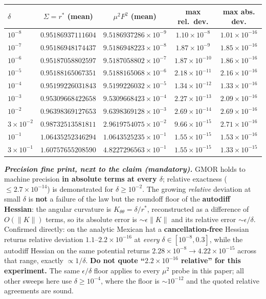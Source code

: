 \documentclass[10pt]{article}
\begin{document}
\begin{center}\small
\begin{tabular}{lcccc}
\toprule
$\delta$ & $\Sigma=r^*$ (mean) & $\mu^2F^2$ (mean) & max rel.\ dev. & max \textbf{abs.} dev. \\
\midrule
$10^{-8}$ & $0.95186937111604$ & $9.5186937286{\times}10^{-9}$ & $1.10{\times}10^{-8}$ & $1.01{\times}10^{-16}$ \\
$10^{-7}$ & $0.95186948174437$ & $9.5186948223{\times}10^{-8}$ & $1.87{\times}10^{-9}$ & $1.85{\times}10^{-16}$ \\
$10^{-6}$ & $0.95187058802597$ & $9.5187058802{\times}10^{-7}$ & $1.87{\times}10^{-10}$ & $1.86{\times}10^{-16}$ \\
$10^{-5}$ & $0.95188165067351$ & $9.5188165068{\times}10^{-6}$ & $2.18{\times}10^{-11}$ & $2.16{\times}10^{-16}$ \\
$10^{-4}$ & $0.95199226031843$ & $9.5199226032{\times}10^{-5}$ & $1.34{\times}10^{-12}$ & $1.33{\times}10^{-16}$ \\
$10^{-3}$ & $0.95309668422658$ & $9.5309668423{\times}10^{-4}$ & $2.27{\times}10^{-13}$ & $2.09{\times}10^{-16}$ \\
$10^{-2}$ & $0.96398369127653$ & $9.6398369128{\times}10^{-3}$ & $2.69{\times}10^{-14}$ & $2.69{\times}10^{-16}$ \\
$3{\times}10^{-2}$ & $0.98732513581811$ & $2.9619754075{\times}10^{-2}$ & $9.66{\times}10^{-15}$ & $2.71{\times}10^{-16}$ \\
$10^{-1}$ & $1.06435252346294$ & $1.0643525235{\times}10^{-1}$ & $1.55{\times}10^{-15}$ & $1.53{\times}10^{-16}$ \\
$3{\times}10^{-1}$ & $1.60757655208590$ & $4.8227296563{\times}10^{-1}$ & $1.55{\times}10^{-15}$ & $1.33{\times}10^{-15}$ \\
\bottomrule
\end{tabular}
\end{center}

\emph{\textbf{Precision fine print, next to the claim (mandatory).}} GMOR holds to machine precision \textbf{in absolute terms at every $\delta$}; relative exactness ($\le2.7{\times}10^{-14}$) is demonstrated for $\delta\ge10^{-2}$. The growing \emph{relative} deviation at small $\delta$ is \textbf{not} a failure of the law but the roundoff floor of the \textbf{autodiff Hessian}: the angular curvature is $K_{\theta\theta}=\delta/r^*$, reconstructed as a difference of $O(\lVert K\rVert)$ terms, so its absolute error is $\sim\epsilon\lVert K\rVert$ and its relative error $\sim\epsilon/\delta$. Confirmed directly: on the analytic Mexican hat a \textbf{cancellation-free} Hessian returns relative deviation $1.1$--$2.2{\times}10^{-16}$ at \emph{every} $\delta\in[10^{-8},0.3]$, while the autodiff Hessian on the same potential returns $2.28{\times}10^{-8}\to4.22{\times}10^{-15}$ across that range, exactly $\propto1/\delta$. \textbf{Do not quote ``$2.2{\times}10^{-16}$ relative'' for this experiment.} The same $\epsilon/\delta$ floor applies to every $\mu^2$ probe in this paper; all other sweeps here use $\delta\ge10^{-4}$, where the floor is $\sim10^{-12}$ and the quoted relative agreements are sound.
\end{document}
